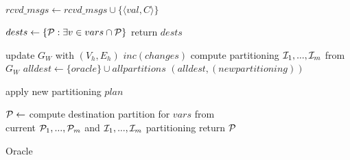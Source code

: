 \begin{algorithm}[t!]
\begin{distribalgo}[1]
\vspace{1.0mm}
	\STATE $rcvd\_msgs \leftarrow rcvd\_msgs \cup \{\langle val, C \rangle\}$
\ENDINDENT

\vspace{1.0mm}
	\STATE $dests \leftarrow \{ \mathcal{P} : \exists v \in vars \cap \mathcal{P} \}$
	\STATE return $dests$
\ENDINDENT

	\vspace{1.0mm}


	\STATE update $G_W$ with $(V_h,E_h)$
	\STATE $inc(changes)$
		\STATE compute partitioning $\mathcal{I}_1, ..., \mathcal{I}_m$ from $G_W$
		\STATE $alldest \leftarrow \{oracle\} \cup all partitions$
		\STATE \amcast$(alldest, (new partitioning))$
	\ENDIF
\ENDINDENT

\vspace{1.0mm}

	\STATE apply new partitioning $plan$
\ENDINDENT

\vspace{1.0mm}

	\STATE $\mathcal{P} \leftarrow$ compute destination partition for $vars$ from\\ \hspace{8mm}current $\mathcal{P}_1, ..., \mathcal{P}_m$ and $\mathcal{I}_1, ..., \mathcal{I}_m$ partitioning
	\STATE return $\mathcal{P}$
\ENDINDENT	
	

\caption{Oracle}
\label{alg:oracle_proxy}
\end{distribalgo}
\end{algorithm}



